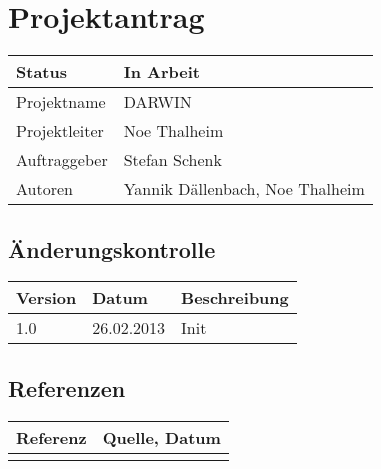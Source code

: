 \documentclass{scrartcl}
\begin{document}
	\section*{Projektantrag}
	
	\begin{tabularx}{\textwidth}{| X | X |}
	\hline
	Status & In Arbeit\\
	\hline
	Projektname & DARWIN\\
	\hline
	Projektleiter & Noe Thalheim\\
	\hline
	Auftraggeber & Stefan Schenk\\
	\hline
	Autoren & Yannik Dällenbach, Noe Thalheim\\
	\hline
	\end{tabularx}
	
	\subsection*{Änderungskontrolle}
	\begin{tabularx}{\textwidth}{| X | X | X |}
	\hline
	\rowcolor[gray]{0.9} Version & Datum & Beschreibung\\
	\hline
	1.0 & 26.02.2013 & Init\\
	\hline
	\end{tabularx}

	\subsection*{Referenzen}
	
	\begin{tabular}{| l | l | }
	\hline
	\rowcolor[gray]{0.9} Referenz & Quelle, Datum\\
	\hline
	 & \\
	 \hline
	\end{tabular}
	
	\pagebreak
	\tableofcontents
	\pagebreak
	
	
	
	
	
	
	
	
	
	
	
\end{document}
